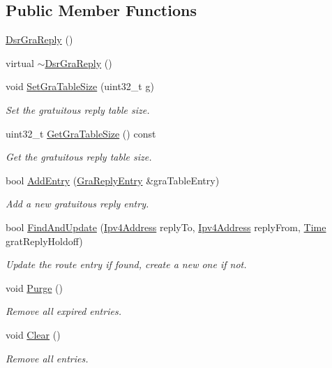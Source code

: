 \subsection*{Public Member Functions}
\begin{DoxyCompactItemize}
\item 
\hyperlink{classns3_1_1dsr_1_1DsrGraReply_a5792733dc46aff7a66e5fb512cd0605b}{Dsr\+Gra\+Reply} ()
\item 
virtual \hyperlink{classns3_1_1dsr_1_1DsrGraReply_a42e7fd06b9d6e8e332578ba6f1176f8d}{$\sim$\+Dsr\+Gra\+Reply} ()
\item 
void \hyperlink{classns3_1_1dsr_1_1DsrGraReply_a9137731288aa4ea5e895ded38d85ffd0}{Set\+Gra\+Table\+Size} (uint32\+\_\+t \hyperlink{loss__OH__suburban_8m_a6182af7c15da7a804d8d96b71bcd5ab7}{g})
\begin{DoxyCompactList}\small\item\em Set the gratuitous reply table size. \end{DoxyCompactList}\item 
uint32\+\_\+t \hyperlink{classns3_1_1dsr_1_1DsrGraReply_aef7c9fdee8ca768049f92735757f6b24}{Get\+Gra\+Table\+Size} () const 
\begin{DoxyCompactList}\small\item\em Get the gratuitous reply table size. \end{DoxyCompactList}\item 
bool \hyperlink{classns3_1_1dsr_1_1DsrGraReply_a0eeeca01927b90e79481ef06e29ed062}{Add\+Entry} (\hyperlink{structns3_1_1dsr_1_1GraReplyEntry}{Gra\+Reply\+Entry} \&gra\+Table\+Entry)
\begin{DoxyCompactList}\small\item\em Add a new gratuitous reply entry. \end{DoxyCompactList}\item 
bool \hyperlink{classns3_1_1dsr_1_1DsrGraReply_ad8e17d0d037d282a4b2f70d40d1a189b}{Find\+And\+Update} (\hyperlink{classns3_1_1Ipv4Address}{Ipv4\+Address} reply\+To, \hyperlink{classns3_1_1Ipv4Address}{Ipv4\+Address} reply\+From, \hyperlink{classns3_1_1Time}{Time} grat\+Reply\+Holdoff)
\begin{DoxyCompactList}\small\item\em Update the route entry if found, create a new one if not. \end{DoxyCompactList}\item 
void \hyperlink{classns3_1_1dsr_1_1DsrGraReply_ab394ca86593dd0f90b9b08ed886a10a8}{Purge} ()
\begin{DoxyCompactList}\small\item\em Remove all expired entries. \end{DoxyCompactList}\item 
void \hyperlink{classns3_1_1dsr_1_1DsrGraReply_ad9c3f8aa076737d7ad2cf533ea2059fd}{Clear} ()
\begin{DoxyCompactList}\small\item\em Remove all entries. \end{DoxyCompactList}\end{DoxyCompactItemize}

